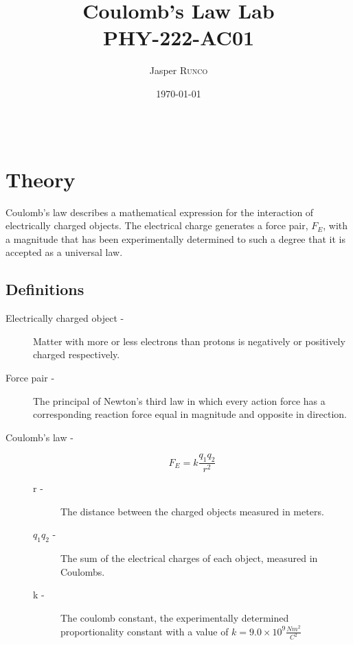 \documentclass{article}
\title{Coulomb's Law Lab\\ PHY-222-AC01} %
\author{Jasper \textsc{Runco}} %
\date{\today} %
\begin{document}
\maketitle %

\begin{center}
\begin{tabular}{l r}
\end{tabular}
\end{center}



\section{Theory}

Coulomb's law describes a mathematical expression for the interaction of electrically charged objects.
The electrical charge generates a force pair, $F_{E}$, with a magnitude that has been experimentally determined
to such a degree that it is accepted as a universal law.

\subsection{Definitions}
\label{definitions}
\begin{description}
	\item[Electrically charged object -]
		Matter with more or less electrons than protons is negatively or
		positively charged respectively.
	\item[Force pair -]
		The principal of Newton's third law in which every action force has a corresponding reaction force
		equal in magnitude and opposite in direction.
	\item[Coulomb's law -]
		\[F_{E} = k \frac{q_1 q_2}{r^2}\]
		\begin{description}
			\item[r -]
				The distance between the charged objects measured in meters.
			\item[$q_1 q_2$ -]
				The sum of the electrical charges of each object, measured in Coulombs.
			\item[k -]
				The coulomb constant, the experimentally determined proportionality constant with a value
				of $k = 9.0 \times 10^{9} \frac{Nm^2}{C^2}$

		\end{description}
\end{description}
\end{document}
